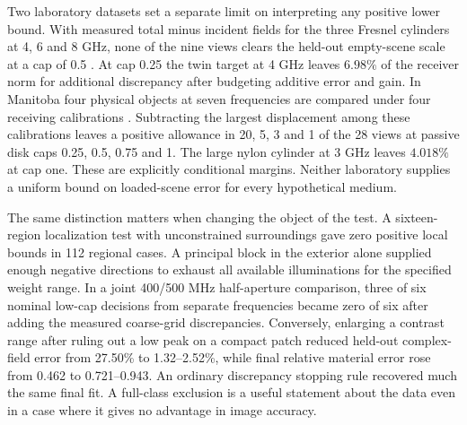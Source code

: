 Two laboratory datasets set a separate limit on interpreting any positive lower bound. With measured total minus incident fields for the three Fresnel cylinders at 4, 6 and 8 GHz, none of the nine views clears the held-out empty-scene scale at a cap of 0.5 \cite{fresnel}. At cap 0.25 the twin target at 4 GHz leaves $6.98\%$ of the receiver norm for additional discrepancy after budgeting additive error and gain. In Manitoba four physical objects at seven frequencies are compared under four receiving calibrations \cite{manitoba}. Subtracting the largest displacement among these calibrations leaves a positive allowance in 20, 5, 3 and 1 of the 28 views at passive disk caps 0.25, 0.5, 0.75 and 1. The large nylon cylinder at 3 GHz leaves $4.018\%$ at cap one. These are explicitly conditional margins. Neither laboratory supplies a uniform bound on loaded-scene error for every hypothetical medium.

The same distinction matters when changing the object of the test. A sixteen-region localization test with unconstrained surroundings gave zero positive local bounds in 112 regional cases. A principal block in the exterior alone supplied enough negative directions to exhaust all available illuminations for the specified weight range. In a joint 400/500 MHz half-aperture comparison, three of six nominal low-cap decisions from separate frequencies became zero of six after adding the measured coarse-grid discrepancies. Conversely, enlarging a contrast range after ruling out a low peak on a compact patch reduced held-out complex-field error from 27.50\% to 1.32--2.52\%, while final relative material error rose from 0.462 to 0.721--0.943. An ordinary discrepancy stopping rule recovered much the same final fit. A full-class exclusion is a useful statement about the data even in a case where it gives no advantage in image accuracy.
\FloatBarrier

